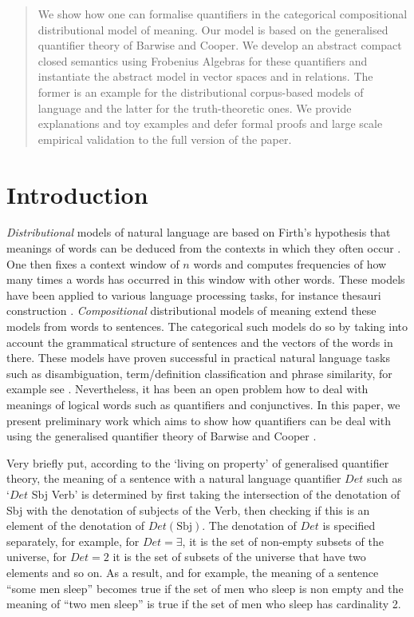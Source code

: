 \documentclass[a4paper,11pt]{easychair}
\begin{document}
\begin{abstract}
We show how one can  formalise quantifiers in the categorical compositional distributional model of meaning. Our model is based on the generalised quantifier theory of Barwise and Cooper. We develop an abstract compact closed semantics using Frobenius Algebras for these quantifiers and instantiate the abstract model in vector spaces and in relations. The former is an example for the  distributional corpus-based models of language  and the latter for the truth-theoretic ones. We provide explanations and toy examples and defer formal proofs and large scale empirical validation to the full version of the paper. 
\end{abstract}


\section{Introduction}
\emph{Distributional} models of natural language are based on Firth's hypothesis that  meanings of words can be deduced from the contexts in which they often occur  \cite{Firth}.  One then fixes a context window of $n$ words and computes frequencies of how many times a words has occurred in this window with other words. These models have been applied to various language processing tasks, for instance thesauri construction \cite{Curran}.  \emph{Compositional} distributional models of meaning extend these  models from words to sentences. The categorical such models \cite{Coeckeetal,BaroniZam} do so by taking into account the grammatical structure of sentences and the vectors of the words in there.  These models have proven successful in practical natural language tasks such as disambiguation, term/definition classification and phrase similarity, for example see \cite{GrefenSadr,KartSadr}. Nevertheless, it has been an open problem how to deal  with  meanings of logical words such as  quantifiers and conjunctives. In this paper, we present preliminary work which aims to show how quantifiers can be deal with using the generalised quantifier  theory  of Barwise and Cooper \cite{BarwiseCooper81}. 

Very briefly put, according to the  `living on property' of generalised quantifier theory, the meaning of a sentence with a natural language  quantifier $Det$ such as  `$Det$ Sbj Verb' is determined by first taking the intersection of the denotation of Sbj with the denotation of subjects of the Verb, then checking if  this is an element of the denotation of $Det(\text{Sbj})$. The denotation of $Det$ is specified separately, for example, for $Det = \exists$, it is the set of non-empty subsets of the universe, for $Det = 2$ it is  the set of  subsets of the universe that have  two elements and so on. As a result, and for example, the meaning of a sentence ``some men sleep'' becomes  true if the set of men who sleep is non empty and the meaning of ``two men sleep'' is true if the set of men who sleep has cardinality 2. 
\end{document}
